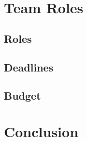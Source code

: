 \documentclass[letterpaper,12pt]{article}
\begin{document}
\subsection{} %
\subsection{}
\subsection{}

\section{Team Roles}
\subsection{Roles}
\subsection{Deadlines}
\subsection{Budget}

\section{Conclusion}
\end{document}
